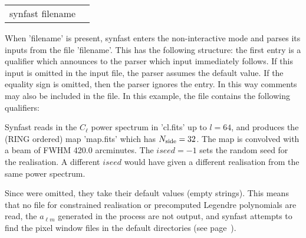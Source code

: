\begin{examples}{2}
{
\begin{tabular}{ll} %
synfast  filename \\
\end{tabular}
}
{When 'filename' is present, synfast enters the non-interactive mode and parses
its inputs from the file 'filename'. This has the following
structure: the first entry is a qualifier which announces to the parser
which input immediately follows. If this input is omitted in the
input file, the parser assumes the default value.
If the equality sign is omitted, then the parser ignores the entry.
In this way comments may also be included in the file.
In this example, the file contains the following qualifiers:\hfill\newline
{}

Synfast reads in the $C_{\ell}$ power spectrum in 'cl.fits' up to $l=64$, and
produces the (RING ordered) map
'map.fits' which has $N_{\rm side}=32$.
The map is convolved with a beam of FWHM 420.0 arcminutes. The $iseed=-1$ sets
the random seed for the realisation. A different $iseed$ would have given a different 
realisation from the same power spectrum.

Since \hfill\newline
{}
were omitted, they take their default values (empty strings). 
This means that no file for constrained realisation or precomputed
Legendre polynomials are read, the $a_{\ell m}$ generated in the process are not
output, and synfast attempts to find the pixel
window files in the default directories (see page~\pageref{page:defdir}).
}
\end{examples}


